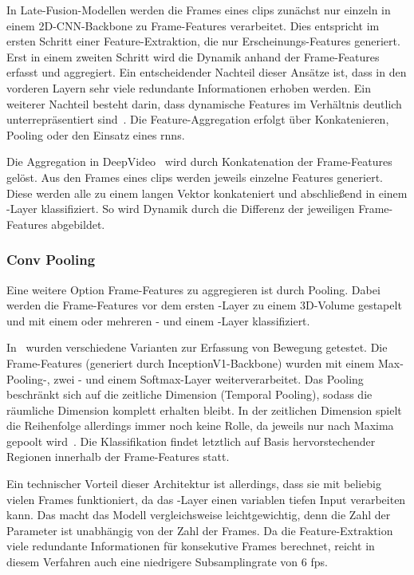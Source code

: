 In Late-Fusion-Modellen werden die Frames eines \glspl{clip} zunächst nur einzeln in einem 2D-CNN-Backbone zu Frame-Features verarbeitet.
Dies entspricht im ersten Schritt einer Feature-Extraktion, die nur Erscheinungs-Features generiert.
Erst in einem zweiten Schritt wird die Dynamik anhand der Frame-Features erfasst und aggregiert.
Ein entscheidender Nachteil dieser Ansätze ist, dass in den vorderen Layern sehr viele redundante Informationen erhoben werden.
Ein weiterer Nachteil besteht darin, dass dynamische Features im Verhältnis deutlich unterrepräsentiert sind~\cite{Karpathy14}.
Die Feature-Aggregation erfolgt über Konkatenieren, Pooling oder den Einsatz eines \glspl{rnn}.

Die Aggregation in DeepVideo~\cite{Karpathy14} wird durch Konkatenation der Frame-Features gelöst.
Aus den Frames eines \glspl{clip} werden jeweils einzelne Features generiert.
Diese werden alle zu einem langen Vektor konkateniert und abschließend in einem \fc-Layer klassifiziert.
So wird Dynamik durch die Differenz der jeweiligen Frame-Features abgebildet.

\subsubsection{Conv Pooling}

Eine weitere Option Frame-Features zu aggregieren ist durch Pooling.
Dabei werden die Frame-Features vor dem ersten \fc-Layer zu einem 3D-Volume gestapelt und mit einem oder mehreren \pool- und einem \fc-Layer klassifiziert.

In~\cite{Ng15} wurden verschiedene Varianten zur Erfassung von Bewegung getestet.
Die Frame-Features (generiert durch InceptionV1-Backbone) wurden mit einem Max-Pooling-, zwei \fc- und einem Softmax-Layer weiterverarbeitet.
Das Pooling beschränkt sich auf die zeitliche Dimension (Temporal Pooling), sodass die räumliche Dimension komplett erhalten bleibt.
In der zeitlichen Dimension spielt die Reihenfolge allerdings immer noch keine Rolle, da jeweils nur nach Maxima gepoolt wird~\cite{Carreira17}.
Die Klassifikation findet letztlich auf Basis hervorstechender Regionen innerhalb der Frame-Features statt.


Ein technischer Vorteil dieser Architektur ist allerdings, dass sie mit beliebig vielen Frames funktioniert, da das \pool-Layer einen variablen tiefen Input verarbeiten kann.
Das macht das Modell vergleichsweise leichtgewichtig, denn die Zahl der Parameter ist unabhängig von der Zahl der Frames.
Da die Feature-Extraktion viele redundante Informationen für konsekutive Frames berechnet, reicht in diesem Verfahren auch eine niedrigere Subsamplingrate von 6 \gls{fps}.

